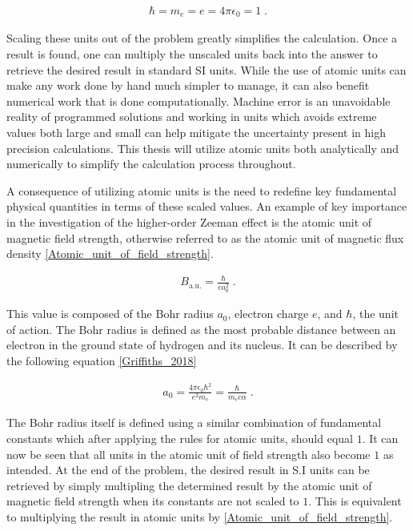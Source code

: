         \begin{align}
            \hbar = m_e = e = 4\pi \epsilon_0 = 1\;.
        \end{align}

        \noindent Scaling these units out of the problem greatly simplifies the calculation. Once a result is found, one can multiply the unscaled units back into the answer to retrieve the desired result in standard SI units. While the use of atomic units can make any work done by hand much simpler to manage, it can also benefit numerical work that is done computationally. Machine error is an unavoidable reality of programmed solutions and working in units which avoids extreme values both large and small can help mitigate the uncertainty present in high precision calculations. This thesis will utilize atomic units both analytically and numerically to simplify the calculation process throughout.

        A consequence of utilizing atomic units is the need to redefine key fundamental physical quantities in terms of these scaled values. An example of key importance in the investigation of the higher-order Zeeman effect is the atomic unit of magnetic field strength, otherwise referred to as the atomic unit of magnetic flux density \ref{Atomic_unit_of_field_strength}.

        \begin{align}
            B_{\text{a.u.}} = \frac{\hbar}{e a_0^2}\;.
        \end{align}

        This value is composed of the Bohr radius $a_0$, electron charge $e$, and $\hbar$, the unit of action. The Bohr radius is defined as the most probable distance between an electron in the ground state of hydrogen and its nucleus. It can be described by the following equation \ref{Griffiths_2018}

        \begin{align}
            a_0 = \frac{4\pi \epsilon_0 \hbar^2}{e^2 m_e} = \frac{\hbar}{m_e c \alpha} \label{eq:bohr_radius}\;.
        \end{align}

        The Bohr radius itself is defined using a similar combination of fundamental constants which after applying the rules for atomic units, should equal $1$. It can now be seen that all units in the atomic unit of field strength also become $1$ as intended. At the end of the problem, the desired result in S.I units can be retrieved by simply multipling the determined result by the atomic unit of magnetic field strength when its constants are not scaled to $1$. This is equivalent to multiplying the result in atomic units by \ref{Atomic_unit_of_field_strength}.

